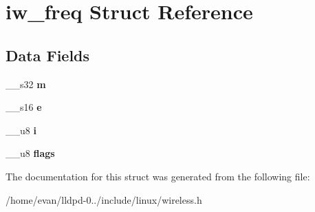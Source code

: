 \section{iw\-\_\-freq \-Struct \-Reference}
\label{structiw__freq}
\subsection*{\-Data \-Fields}
\begin{DoxyCompactItemize}
\item 
\-\_\-\-\_\-s32 {\bfseries m}\label{structiw__freq_a7b3ccb964146f26afe5c7f338ffb532e}

\item 
\-\_\-\-\_\-s16 {\bfseries e}\label{structiw__freq_a30229ecf754f55acd33e26001bdb093a}

\item 
\-\_\-\-\_\-u8 {\bfseries i}\label{structiw__freq_a55df8f936bfbb04b8c6978d0a0364f8a}

\item 
\-\_\-\-\_\-u8 {\bfseries flags}\label{structiw__freq_a1ff0cbb99303f78cddccfc98582c5bf3}

\end{DoxyCompactItemize}


\-The documentation for this struct was generated from the following file\-:\begin{DoxyCompactItemize}
\item 
/home/evan/lldpd-\/0../include/linux/wireless.\-h\end{DoxyCompactItemize}
